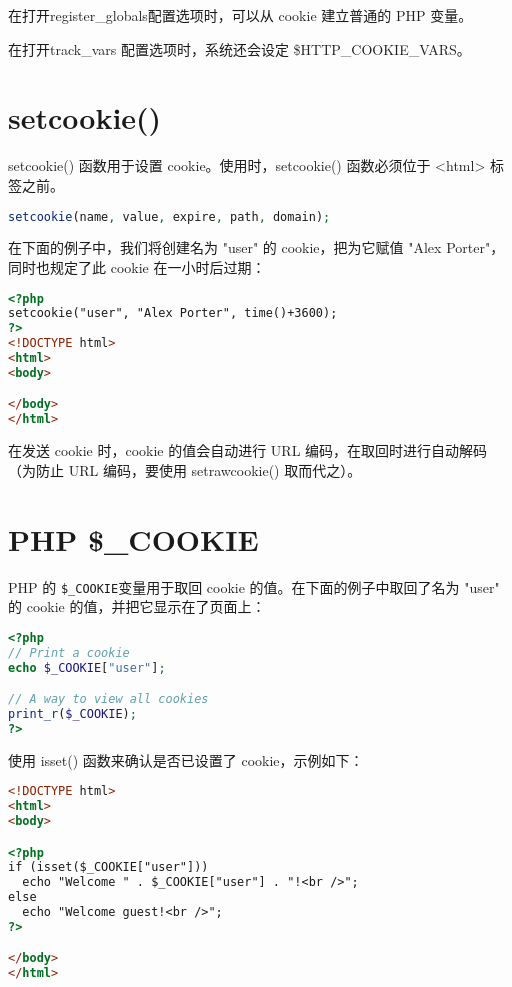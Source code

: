 \begin{compactitem}
\item 在打开register\_globals配置选项时，可以从 cookie 建立普通的 PHP 变量。
\item 在打开track\_vars 配置选项时，系统还会设定 \$HTTP\_COOKIE\_VARS。
\end{compactitem}


\section{setcookie()}


setcookie() 函数用于设置 cookie。使用时，setcookie() 函数必须位于 <html> 标签之前。


\begin{lstlisting}[language=PHP]
setcookie(name, value, expire, path, domain);
\end{lstlisting}


在下面的例子中，我们将创建名为 "user" 的 cookie，把为它赋值 "Alex Porter"，同时也规定了此 cookie 在一小时后过期：

\begin{lstlisting}[language=HTML]
<?php 
setcookie("user", "Alex Porter", time()+3600);
?>
<!DOCTYPE html>
<html>
<body>

</body>
</html>
\end{lstlisting}

在发送 cookie 时，cookie 的值会自动进行 URL 编码，在取回时进行自动解码（为防止 URL 编码，要使用 setrawcookie() 取而代之）。


\section{PHP \$\_COOKIE}


PHP 的 \texttt{\$\_COOKIE}变量用于取回 cookie 的值。在下面的例子中取回了名为 "user" 的 cookie 的值，并把它显示在了页面上：

\begin{lstlisting}[language=PHP]
<?php
// Print a cookie
echo $_COOKIE["user"];

// A way to view all cookies
print_r($_COOKIE);
?>
\end{lstlisting}


使用 isset() 函数来确认是否已设置了 cookie，示例如下：


\begin{lstlisting}[language=HTML]
<!DOCTYPE html>
<html>
<body>

<?php
if (isset($_COOKIE["user"]))
  echo "Welcome " . $_COOKIE["user"] . "!<br />";
else
  echo "Welcome guest!<br />";
?>

</body>
</html>
\end{lstlisting}



